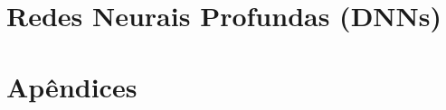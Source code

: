 \documentclass[
    12pt,            %
    a4paper,         %
    book,            %
    openright,       %
    twoside,         %
    brazil,          %
    citacao=authoryear
]{abntex2}
\begin{document}
\part{Redes Neurais Profundas (DNNs)}















\appendix
\part{Apêndices}







% 


\backmatter

\printbibliography[title={Referências}]

\cleardoublepage %
\printglossaries %

\printindex
\end{document}
